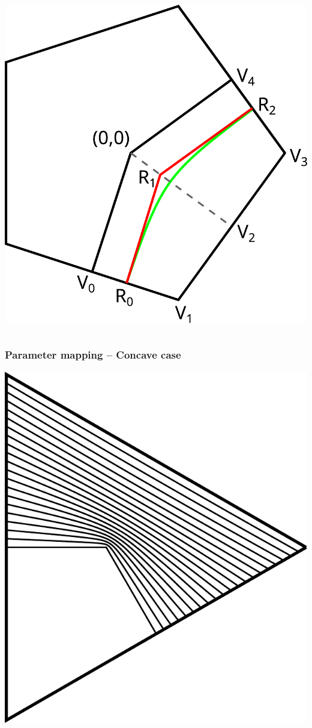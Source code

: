 \documentclass{beamer}
\begin{document}
\begin{frame}
\begin{columns}
    \includegraphics[width=\textwidth]{images/rational-control.pdf}
  \end{columns}
\end{frame}

\begin{frame}
  \frametitle{Parameter mapping -- Concave case}
  \includegraphics[width=.6\textwidth]{images/rational3.pdf}
  \centering
\end{frame}
\end{document}
